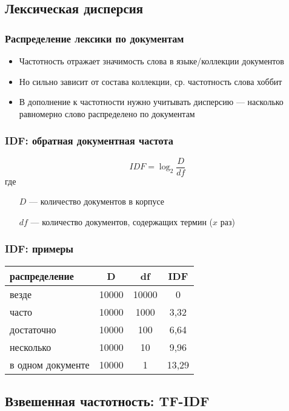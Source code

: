 \documentclass[svgnames]{beamer}
\begin{document}
\subsection{Лексическая дисперсия}

\begin{frame}
  \frametitle{Распределение лексики по документам}
  \begin{itemize}
  \item Частотность отражает значимость слова в языке/коллекции документов
  \item Но сильно зависит от состава коллекции, ср. частотность слова
    \alert{хоббит}
  \item В дополнение к частотности нужно учитывать \alert{дисперсию} —
    насколько равномерно слово распределено по документам
  \end{itemize}
\end{frame}

\begin{frame}
  \frametitle{IDF: обратная документная частота}
  \begin{equation}
    IDF=\log_2\frac{D}{df}
  \end{equation}
  где 
  \begin{itemize}
  \item[$D$] — количество документов в корпусе
  \item[$df$] — количество документов, содержащих термин ($x$ раз)
  \end{itemize}
\end{frame}

\begin{frame}
  \frametitle{IDF: примеры}
  \begin{tabular}[l]{lccc}
    распределение & D & df & IDF \\
    \hline
    везде & 10000 & 10000 & 0 \\
    часто & 10000 & 1000 & 3,32 \\
    достаточно & 10000 & 100 & 6,64 \\
    несколько & 10000 & 10 & 9,96 \\
    в одном документе & 10000 & 1 & 13,29 \\
  \end{tabular}
\end{frame}


\subsection{Взвешенная частотность: TF-IDF}
\end{document}
